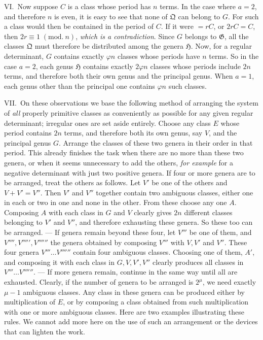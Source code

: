 VI.\ Now suppose \(C\) is a class whose period has \(n\) terms. In the case where \(a=2\), and therefore \(n\) is even, it is easy to see that none of \(\mathfrak Q\) can belong to \(G\). For such a class would then be contained in the period of \(C\). If it were \(=rC\), or \(2rC=C\), then \(2r\equiv1\; (\mathrm{mod}.\ n)\), \textit{which is a contradiction}. Since \(G\) belongs to \(\mathfrak G\), all the classes \(\mathfrak Q\) must therefore be distributed among the genera \(\mathfrak H\). Now, for a regular determinant, \(G\) contains exactly \(\varphi n\) classes whose periods have \(n\) terms. So in the case \(a=2\), each genus \(\mathfrak H\) contains exactly \(2\varphi n\) classes whose periods include \(2n\) terms, and therefore both their own genus and the principal genus. When \(a=1\), each genus other than the principal one contains \(\varphi n\) such classes.

VII.\ On these observations we base the following method of arranging the system of \textit{all} properly primitive classes as conveniently as possible for any given regular determinant; irregular ones are set aside entirely. Choose any class \(E\) whose period contains \(2n\) terms, and therefore both its own genus, say \(V\), and the principal genus \(G\). Arrange the classes of these two genera in their order in that period. This already finishes the task when there are no more than these two genera, or when it seems unnecessary to add the others, \textit{for example} for a negative determinant with just two positive genera. If four or more genera are to be arranged, treat the others as follows. Let \(V'\) be one of the others and \(V+V'=V''\). Then \(V'\) and \(V''\) together contain two ambiguous classes, either one in each or two in one and none in the other. From these
choose any one \(A\). Composing \(A\) with each class in \(G\) and \(V\) clearly gives \(2n\) different classes belonging to \(V'\) and \(V''\), and therefore exhausting these genera. So these too can be arranged. — If genera remain beyond these four, let \(V'''\) be one of them, and \(V'''',V''''',V''''''\) the genera obtained by composing \(V'''\) with \(V,V'\) and \(V''\). These four genera \(V'''\ldots V''''''\) contain four ambiguous classes. Choosing one of them, \(A'\), and composing it with each class in \(G,V,V',V''\) clearly produces all classes in \(V'''\ldots V''''''\). — If more genera remain, continue in the same way until all are exhausted. Clearly, if the number of genera to be arranged is \(2^\mu\), we need exactly \(\mu-1\) ambiguous classes. Any class in these genera can be produced either by multiplication of \(E\), or by composing a class obtained from such multiplication with one or more ambiguous classes. Here are two examples illustrating these rules. We cannot add more here on the use of such an arrangement or the devices that can lighten the work.

